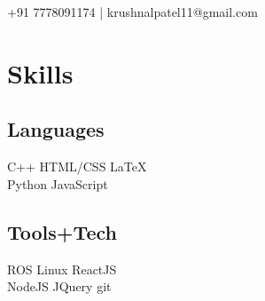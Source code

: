 \documentclass[letterpaper]{deedy-resume} %
\begin{document}


{ +91 7778091174 | krushnalpatel11@gmail.com }

\begin{minipage}[t]{0.33\textwidth} 

\section{Skills}

\subsection{Languages}
C++ \hspace{0.1cm} \textbullet \hspace{0.1cm}
HTML/CSS \hspace{0.1cm} \textbullet \hspace{0.1cm}
\LaTeX{}\\
Python\hspace{0.1cm} \textbullet \hspace{0.1cm}
JavaScript %

\vspace{0.3cm}

\subsection{Tools+Tech}
ROS \hspace{0.1cm} \textbullet \hspace{0.1cm}
Linux \hspace{0.1cm} \textbullet \hspace{0.1cm}
ReactJS \\
NodeJS \hspace{0.1cm} \textbullet \hspace{0.1cm}
JQuery \hspace{0.1cm} \textbullet \hspace{0.1cm}
git
\vspace{0.3cm}


\end{minipage}
\end{document}
